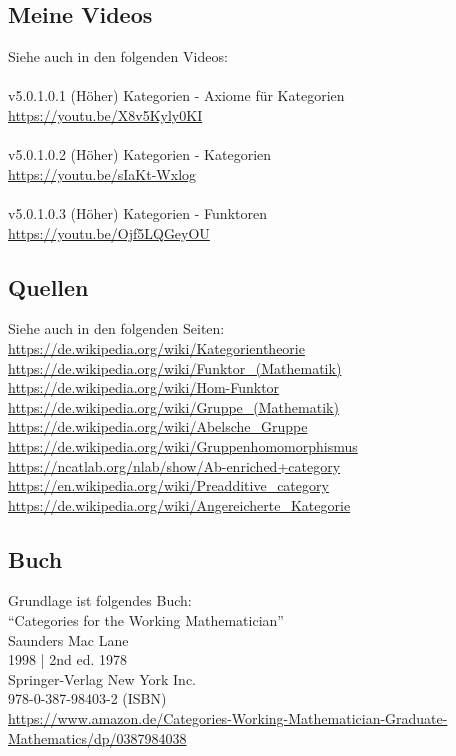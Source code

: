 \documentclass[a4paper]{amsart}
\theoremstyle{definition}
\begin{document}
\subsection*{Meine Videos}
Siehe auch in den folgenden Videos:\\ \\
v5.0.1.0.1 (Höher) Kategorien - Axiome für Kategorien\\
\url{https://youtu.be/X8v5Kyly0KI}\\
\\
v5.0.1.0.2 (Höher) Kategorien - Kategorien\\
\url{https://youtu.be/sIaKt-Wxlog}\\
\\
v5.0.1.0.3 (Höher) Kategorien - Funktoren\\
\url{https://youtu.be/Ojf5LQGeyOU}

\subsection*{Quellen}
Siehe auch in den folgenden Seiten:\\
\url{https://de.wikipedia.org/wiki/Kategorientheorie}\\
\url{https://de.wikipedia.org/wiki/Funktor_(Mathematik)}\\
\url{https://de.wikipedia.org/wiki/Hom-Funktor}\\
\url{https://de.wikipedia.org/wiki/Gruppe_(Mathematik)}\\
\url{https://de.wikipedia.org/wiki/Abelsche_Gruppe}\\
\url{https://de.wikipedia.org/wiki/Gruppenhomomorphismus}\\
\url{https://ncatlab.org/nlab/show/Ab-enriched+category}\\
\url{https://en.wikipedia.org/wiki/Preadditive_category}\\
\url{https://de.wikipedia.org/wiki/Angereicherte_Kategorie}

\subsection*{Buch}
Grundlage ist folgendes Buch:\\
"`Categories for the Working Mathematician"'\\
Saunders Mac Lane\\
1998 | 2nd ed. 1978\\
Springer-Verlag New York Inc.\\
978-0-387-98403-2 (ISBN)\\
{\tiny
   \url{https://www.amazon.de/Categories-Working-Mathematician-Graduate-Mathematics/dp/0387984038}}\\
\end{document}
